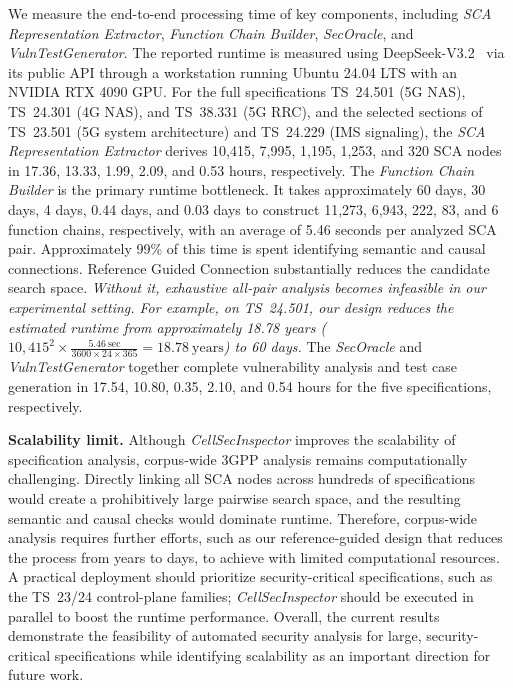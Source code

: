 \documentclass[sigconf]{acmart}
\newcommand{\lm}{\textit{CellSecInspector}\xspace}
\begin{document}
{We measure the end-to-end processing time of key components, including \textit{SCA Representation Extractor}, \textit{Function Chain Builder}, \textit{SecOracle}, and \textit{VulnTestGenerator}. The reported runtime is measured using DeepSeek-V3.2~\cite{deepseek_v32_release_2025} via its public API through a workstation running Ubuntu 24.04 LTS with an NVIDIA RTX 4090 GPU.   
For the full specifications TS~24.501 (5G NAS), TS~24.301 (4G NAS), and TS~38.331 (5G RRC), and the selected sections of TS~23.501 (5G system architecture) and TS~24.229 (IMS signaling), the \textit{SCA Representation Extractor} derives 10,415, 7,995, 1,195, 1,253, and 320 SCA nodes in 17.36, 13.33, 1.99, 2.09, and 0.53 hours, respectively. The \textit{Function Chain Builder} is the primary runtime bottleneck. 
It takes approximately 60 days, 30 days, 4 days, 0.44 days, and 0.03 days to construct 11,273, 6,943, 222, 83, and 6 function chains, respectively, with an average of 5.46 seconds per analyzed SCA pair. Approximately 99\% of this time is spent identifying semantic and causal connections. Reference Guided Connection substantially reduces the candidate search space. \textit{Without it, exhaustive all-pair analysis becomes infeasible in our experimental setting. For example, on TS~24.501, our design reduces the estimated runtime from approximately 18.78 years ($10,415^2 \times \frac{5.46~\text{sec}}{3600 \times 24 \times 365} = 18.78 ~\text{years}$) to 60 days.} The \textit{SecOracle} and \textit{VulnTestGenerator} together complete vulnerability analysis and test case generation in 17.54, 10.80, 0.35, 2.10, and 0.54 hours for the five specifications, respectively. 

\noindent\textbf{Scalability limit.}
Although \lm improves the scalability of specification analysis, corpus-wide 3GPP analysis remains computationally challenging. Directly linking all SCA nodes across hundreds of specifications would create a prohibitively large pairwise search space, and the resulting semantic and causal checks would dominate runtime. Therefore, corpus-wide analysis requires further efforts, such as our reference-guided design that reduces the process from years to days, to achieve with limited computational resources. A practical deployment should prioritize security-critical specifications, such as the TS~23/24 control-plane families; \lm should be executed in parallel to boost the runtime performance. Overall, the current results demonstrate the feasibility of automated security analysis for large, security-critical specifications while identifying scalability as an important direction for future work.  


}
\end{document}

